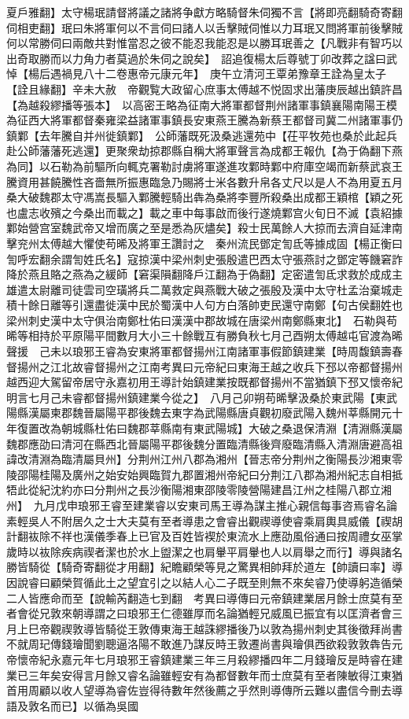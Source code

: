 夏戶雅翻】太守楊珉請督將議之諸將争獻方略騎督朱伺獨不言【將即亮翻騎奇寄翻伺相吏翻】珉曰朱將軍何以不言伺曰諸人以舌擊賊伺惟以力耳珉又問將軍前後擊賊何以常勝伺曰兩敵共對惟當忍之彼不能忍我能忍是以勝耳珉善之【凡戰非有智巧以出奇取勝而以力角力者莫過於朱伺之說矣】　詔追復楊太后尊號丁卯改葬之諡曰武悼【楊后遇禍見八十二卷惠帝元康元年】　庚午立清河王覃弟豫章王詮為皇太子【詮且緣翻】辛未大赦　帝觀覧大政留心庶事太傅越不悦固求出藩庚辰越出鎮許昌【為越殺繆播等張本】　以高密王略為征南大將軍都督荆州諸軍事鎮襄陽南陽王模為征西大將軍都督秦雍梁益諸軍事鎮長安東燕王騰為新蔡王都督司冀二州諸軍事仍鎮鄴【去年騰自并州徙鎮鄴】　公師藩既死汲桑逃還苑中【茌平牧苑也桑於此起兵赴公師藩藩死逃還】更聚衆劫掠郡縣自稱大將軍聲言為成都王報仇【為于偽翻下燕為同】以石勒為前驅所向輒克署勒討虜將軍遂進攻鄴時鄴中府庫空竭而新蔡武哀王騰資用甚饒騰性吝嗇無所振惠臨急乃賜將士米各數升帛各丈尺以是人不為用夏五月桑大破魏郡太守馮嵩長驅入鄴騰輕騎出犇為桑將李豐所殺桑出成都王穎棺【穎之死也盧志收殯之今桑出而載之】載之車中每事啟而後行遂燒鄴宫火旬日不滅【袁紹據鄴始營宫室魏武帝又增而廣之至是悉為灰燼矣】殺士民萬餘人大掠而去濟自延津南擊兖州太傅越大懼使苟晞及將軍王讚討之　秦州流民鄧定訇氐等據成固【楊正衡曰訇呼宏翻余謂訇姓氏名】寇掠漢中梁州刺史張殷遣巴西太守張燕討之鄧定等饑窘詐降於燕且賂之燕為之緩師【窘渠隕翻降戶江翻為于偽翻】定密遣訇氐求救於成成主雄遣太尉離司徒雲司空璜將兵二萬救定與燕戰大破之張殷及漢中太守杜孟治棄城走積十餘日離等引還盡徙漢中民於蜀漢中人句方白落帥吏民還守南鄭【句古侯翻姓也梁州刺史漢中太守俱治南鄭杜佑曰漢漢中郡故城在唐梁州南鄭縣東北】　石勒與苟晞等相持於平原陽平間數月大小三十餘戰互有勝負秋七月己酉朔太傅越屯官渡為晞聲援　己未以琅邪王睿為安東將軍都督揚州江南諸軍事假節鎮建業【時周馥鎮壽春督揚州之江北故睿督揚州之江南考異曰元帝紀曰東海王越之收兵下邳以帝都督揚州越西迎大駕留帝居守永嘉初用王導計始鎮建業按既都督揚州不當猶鎮下邳又懷帝紀明言七月己未睿都督揚州鎮建業今從之】　八月己卯朔苟晞擊汲桑於東武陽【東武陽縣漢屬柬郡魏晉屬陽平郡後魏去東字為武陽縣唐貞觀初廢武陽入魏州莘縣開元十年復置改為朝城縣杜佑曰魏郡莘縣南有東武陽城】大破之桑退保清淵【清淵縣漢屬魏郡應劭曰清河在縣西北晉屬陽平郡後魏分置臨清縣後齊廢臨清縣入清淵唐避高祖諱改清淵為臨清屬貝州】分荆州江州八郡為湘州【晉志帝分荆州之衡陽長沙湘東零陵邵陽桂陽及廣州之始安始興臨賀九郡置湘州帝紀曰分荆江八郡為湘州紀志自相抵牾此從紀沈約亦曰分荆州之長沙衡陽湘東邵陵零陵營陽建昌江州之桂陽八郡立湘州】　九月戊申琅邪王睿至建業睿以安東司馬王導為謀主推心親信每事咨焉睿名論素輕吳人不附居久之士大夫莫有至者導患之會睿出觀禊導使睿乘肩輿具威儀【禊胡計翻䘠除不祥也漢儀季春上已官及百姓皆褉於東流水上應劭風俗通曰按周禮女巫掌歲時以䘠除疾病禊者潔也於水上盥潔之也肩轝平肩轝也人以肩舉之而行】導與諸名勝皆騎從【騎奇寄翻從才用翻】紀瞻顧榮等見之驚異相帥拜於道左【帥讀曰率】導因說睿曰顧榮賀循此土之望宜引之以結人心二子既至則無不來矣睿乃使導躬造循榮二人皆應命而至【說輸芮翻造七到翻　考異曰導傳曰元帝鎮建業居月餘士庶莫有至者會從兄敦來朝導謂之曰琅邪王仁德雖厚而名論猶輕兄威風已振宜有以匡濟者會三月上巳帝觀禊敦導皆騎從王敦傳東海王越誅繆播後乃以敦為揚州刺史其後徵拜尚書不就周玘傳錢璯聞劉聰逼洛陽不敢進乃謀反時王敦遷尚書與璯俱西欲殺敦敦犇告元帝懷帝紀永嘉元年七月琅邪王睿鎮建業三年三月殺繆播四年二月錢璯反是時睿在建業已三年矣安得言月餘又睿名論雖輕安有為都督數年而士庶莫有至者陳敏得江東猶首用周顧以收人望導為睿佐豈得待數年然後薦之乎然則導傳所云難以盡信今刪去導語及敦名而已】以循為吳國
